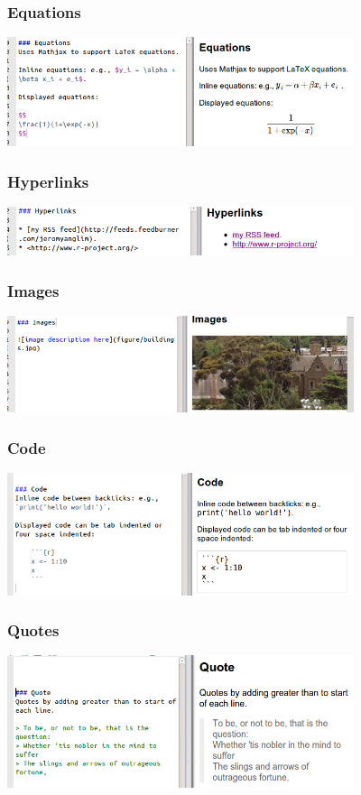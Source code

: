 \begin{frame}\frametitle{Equations}

\includegraphics[width=4in]{figures/equations.png}

\end{frame}

\begin{frame}\frametitle{Hyperlinks}

\includegraphics[width=4in]{figures/links.png}

\end{frame}

\begin{frame}\frametitle{Images}

\includegraphics[width=4in]{figures/images.png}

\end{frame}

\begin{frame}\frametitle{Code}

\includegraphics[width=4in]{figures/code.png}

\end{frame}

\begin{frame}\frametitle{Quotes}

\includegraphics[width=4in]{figures/quote.png}

\end{frame}

